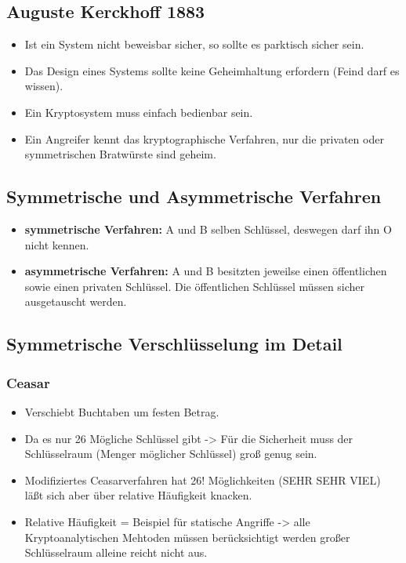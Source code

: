 \documentclass[a4paper,10pt]{scrartcl}
\begin{document}
 \subsection{Auguste Kerckhoff 1883}
 
\begin{itemize}
 \item Ist ein System nicht beweisbar sicher, so sollte es parktisch sicher sein.
 \item Das Design eines Systems sollte keine Geheimhaltung erfordern (Feind darf es wissen).
 \item Ein Kryptosystem muss einfach bedienbar sein.
 \item Ein Angreifer kennt das kryptographische Verfahren, nur die privaten oder symmetrischen Bratwürste sind geheim.
\end{itemize}

\subsection{Symmetrische und Asymmetrische Verfahren}


\begin{itemize}
 \item \textbf{symmetrische Verfahren:} A und B selben Schlüssel, deswegen darf ihn O nicht kennen.
 \item \textbf{asymmetrische Verfahren:} A und B besitzten jeweilse einen öffentlichen sowie einen privaten Schlüssel.
 Die öffentlichen Schlüssel müssen sicher ausgetauscht werden.
\end{itemize}

\subsection{Symmetrische Verschlüsselung im Detail}

\subsubsection{Ceasar}
\begin{itemize}
\item Verschiebt Buchtaben um festen Betrag.
\item Da es nur 26 Mögliche Schlüssel gibt -> Für die Sicherheit muss der Schlüsselraum (Menger möglicher Schlüssel) groß genug sein.
\item Modifiziertes Ceasarverfahren hat 26! Möglichkeiten (SEHR SEHR VIEL) läßt sich aber über relative Häufigkeit knacken.
\item Relative Häufigkeit = Beispiel für statische Angriffe  -> alle Kryptoanalytischen Mehtoden müssen berücksichtigt werden 
großer Schlüsselraum alleine reicht nicht aus.
\end{itemize}
\end{document}
